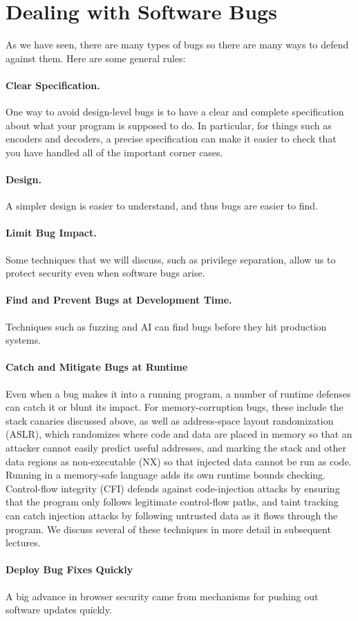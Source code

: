 \section{Dealing with Software Bugs}
As we have seen, there are many types of bugs so there are many ways
to defend against them.
Here are some general rules:

\paragraph{Clear Specification.} One way to avoid design-level bugs is to have a clear and complete specification about what your program is supposed to do.
In particular, for things such as encoders and decoders, a precise specification
can make it easier to check that you have handled all of the important corner cases.

\paragraph{Design.} A simpler design is easier to understand, 
and thus bugs are easier to find. 

\paragraph{Limit Bug Impact.} 
Some techniques that we will
discuss, such as privilege separation, allow us to protect
security even when software bugs arise.

\paragraph{Find and Prevent Bugs at Development Time.}
Techniques such as fuzzing and AI can find bugs before they hit
production systems.

\paragraph{Catch and Mitigate Bugs at Runtime}
Even when a bug makes it into a running program, a number of runtime
defenses can catch it or blunt its impact. For memory-corruption bugs,
these include the stack canaries discussed above, as well as
address-space layout randomization (ASLR), which randomizes where code
and data are placed in memory so that an attacker cannot easily predict
useful addresses, and marking the stack and other data regions as
non-executable (NX) so that injected data cannot be run as code. Running
in a memory-safe language adds its own runtime bounds checking.
Control-flow integrity (CFI) defends against code-injection attacks by
ensuring that the program only follows legitimate control-flow paths, and
taint tracking can catch injection attacks by following untrusted data as
it flows through the program. We discuss several of these techniques in
more detail in subsequent lectures.

\paragraph{Deploy Bug Fixes Quickly}
A big advance in browser security came from mechanisms
for pushing out software updates quickly. 
